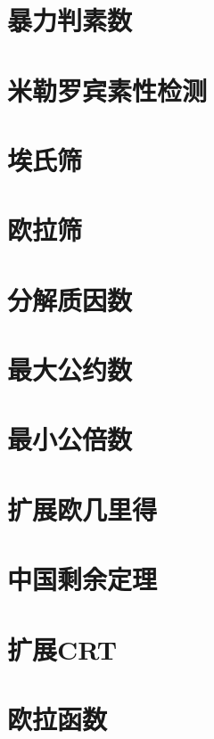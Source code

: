 \section{暴力判素数}
\raggedbottom
\hrulefill
\section{米勒罗宾素性检测}
\raggedbottom
\hrulefill
\section{埃氏筛}
\raggedbottom
\hrulefill
\section{欧拉筛}
\raggedbottom
\hrulefill
\section{分解质因数}
\raggedbottom
\hrulefill
\section{最大公约数}
\raggedbottom
\hrulefill
\section{最小公倍数}
\raggedbottom
\hrulefill
\section{扩展欧几里得}
\raggedbottom
\hrulefill
\section{中国剩余定理}
\raggedbottom
\hrulefill
\section{扩展CRT}
\raggedbottom
\hrulefill
\section{欧拉函数}
\raggedbottom
\hrulefill

